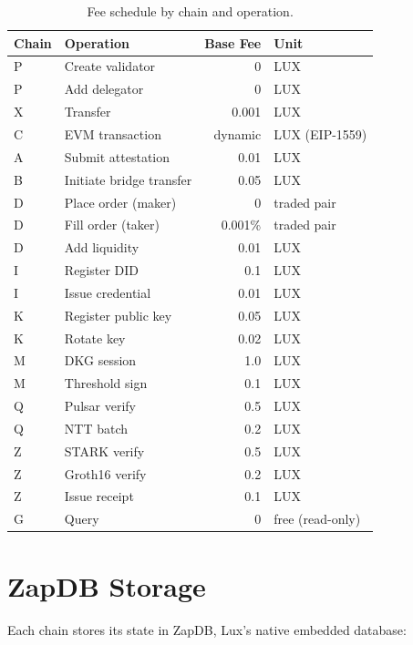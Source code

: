 \documentclass[11pt,a4paper]{article}
\begin{document}
\begin{table}[h]
\centering
\begin{tabular}{llrl}
\toprule
\textbf{Chain} & \textbf{Operation} & \textbf{Base Fee} & \textbf{Unit} \\
\midrule
P & Create validator & 0 & LUX \\
P & Add delegator & 0 & LUX \\
X & Transfer & 0.001 & LUX \\
C & EVM transaction & dynamic & LUX (EIP-1559) \\
A & Submit attestation & 0.01 & LUX \\
B & Initiate bridge transfer & 0.05 & LUX \\
D & Place order (maker) & 0 & traded pair \\
D & Fill order (taker) & 0.001\% & traded pair \\
D & Add liquidity & 0.01 & LUX \\
I & Register DID & 0.1 & LUX \\
I & Issue credential & 0.01 & LUX \\
K & Register public key & 0.05 & LUX \\
K & Rotate key & 0.02 & LUX \\
M & DKG session & 1.0 & LUX \\
M & Threshold sign & 0.1 & LUX \\
Q & Pulsar verify & 0.5 & LUX \\
Q & NTT batch & 0.2 & LUX \\
Z & STARK verify & 0.5 & LUX \\
Z & Groth16 verify & 0.2 & LUX \\
Z & Issue receipt & 0.1 & LUX \\
G & Query & 0 & free (read-only) \\
\bottomrule
\end{tabular}
\caption{Fee schedule by chain and operation.}
\end{table}

\section{ZapDB Storage}

Each chain stores its state in ZapDB, Lux's native embedded database:
\end{document}
